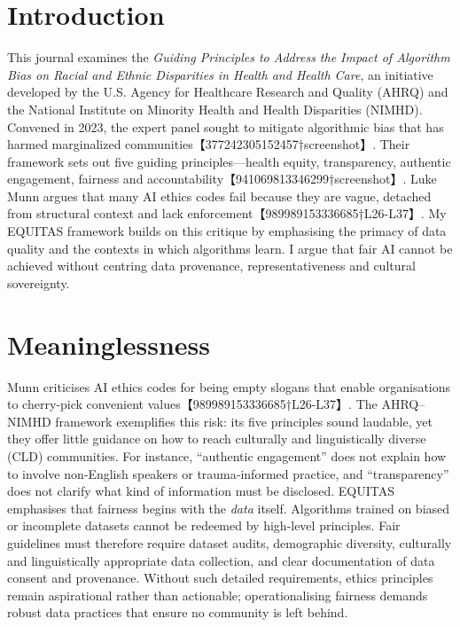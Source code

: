 \documentclass[11pt,twoside]{article}
\title{
\vspace*{2in}
\textbf{\Huge Reinventing AI Ethics}\[1em]
\Large A Critical Journal on the AHRQ–NIMHD Framework Through Munn and EQUITAS\[2em]
\large Piter Garcia\
\small IDAI700: Ethics of Artificial Intelligence\
Rochester Institute of Technology\
\texttt{pzg8794@rit.edu}\[3em]
\large October 4, 2025
}
\author{}  %
\date{}    %
\begin{document}
\thispagestyle{empty}
\maketitle
\newpage

\pagestyle{fancy}

\section{Introduction}
This journal examines the \textit{Guiding Principles to Address the Impact of Algorithm Bias on Racial and Ethnic Disparities in Health and Health Care}, an initiative developed by the U.S. Agency for Healthcare Research and Quality (AHRQ) and the National Institute on Minority Health and Health Disparities (NIMHD). Convened in 2023, the expert panel sought to mitigate algorithmic bias that has harmed marginalized communities【377242305152457†screenshot】. Their framework sets out five guiding principles—health equity, transparency, authentic engagement, fairness and accountability【941069813346299†screenshot】. Luke Munn argues that many AI ethics codes fail because they are vague, detached from structural context and lack enforcement【989989153336685†L26-L37】. My EQUITAS framework builds on this critique by emphasising the primacy of data quality and the contexts in which algorithms learn. I argue that fair AI cannot be achieved without centring data provenance, representativeness and cultural sovereignty.

\section{Meaninglessness}
Munn criticises AI ethics codes for being empty slogans that enable organisations to cherry‑pick convenient values【989989153336685†L26-L37】. The AHRQ–NIMHD framework exemplifies this risk: its five principles sound laudable, yet they offer little guidance on how to reach culturally and linguistically diverse (CLD) communities. For instance, “authentic engagement” does not explain how to involve non‑English speakers or trauma‑informed practice, and “transparency” does not clarify what kind of information must be disclosed. EQUITAS emphasises that fairness begins with the \emph{data} itself. Algorithms trained on biased or incomplete datasets cannot be redeemed by high‑level principles. Fair guidelines must therefore require dataset audits, demographic diversity, culturally and linguistically appropriate data collection, and clear documentation of data consent and provenance. Without such detailed requirements, ethics principles remain aspirational rather than actionable; operationalising fairness demands robust data practices that ensure no community is left behind.
\end{document}
